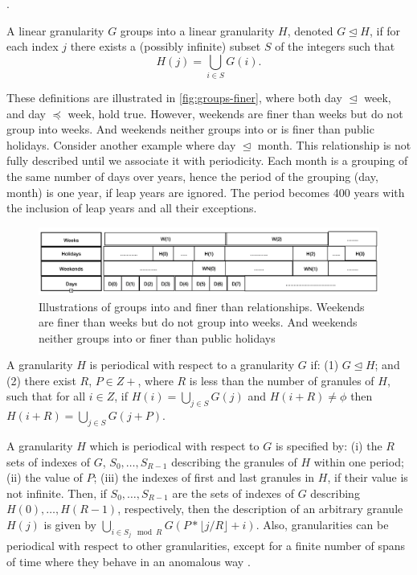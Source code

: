 \documentclass[12pt]{article}
\begin{document}
.

\begin{definition}\label{def:groupsinto}
A linear granularity $G$ groups into a linear granularity $H$, denoted
$G \trianglelefteq H$, if for each index $j$ there exists a (possibly infinite) subset $S$ of the integers such that
\[
  H(j) = \bigcup_{i \in S}G(i).
\]
\end{definition}

These definitions are illustrated in \autoref{fig:groups-finer}, where both day \(\trianglelefteq\) week, and day \(\preceq\) week, hold true. However, weekends are finer than weeks but do not group into weeks. And weekends neither groups into or is finer than public holidays. Consider another example where day \(\trianglelefteq\) month. This relationship is not fully described until we associate it with periodicity. Each month is a grouping of the same number of days over years, hence the period of the grouping (day, month) is one year, if leap years are ignored. The period becomes 400 years with the inclusion of leap years and all their exceptions.

\begin{figure}

{\centering \includegraphics[width=1\linewidth]{Figs/groupsandfiner} 

}

\caption{Illustrations of groups into and finer than relationships. Weekends are finer than weeks but do not group into weeks. And weekends neither groups into or finer than public holidays}\label{fig:groups-finer}
\end{figure}

\begin{definition}\label{def:periodical}
A granularity $H$ is periodical with respect to a granularity $G$ if:
(1) $G \trianglelefteq H$; and
(2) there exist $R$, $P \in Z+$, where $R$ is less than the number of granules of $H$, such that for all $i \in Z$, if $H(i) = \bigcup_{j \in S}G(j)$ and $H (i + R) \neq \phi$ then $H (i + R) = \bigcup_{j \in S} G(j + P)$.
\end{definition}

A granularity \(H\) which is periodical with respect to \(G\) is specified by:
(i) the \(R\) sets of indexes of \(G\), \({S_0,\dots,S_{R-1}}\) describing the granules of \(H\) within one period;
(ii) the value of \(P\);
(iii) the indexes of first and last granules in \(H\), if their value is not infinite.
Then, if \({S_0,\dots,S_{R-1}}\) are the sets of indexes of \(G\) describing
\(H(0), \dots, H(R - 1)\), respectively, then the description of an arbitrary granule \(H(j)\) is given by \(\bigcup_{i \in S_j \mod R}G(P*\lfloor j/R \rfloor + i)\). Also, granularities can be periodical with respect to other granularities, except for a finite number of spans of time where they behave in an anomalous way \citep{Bettini2000-vy}.
\end{document}
